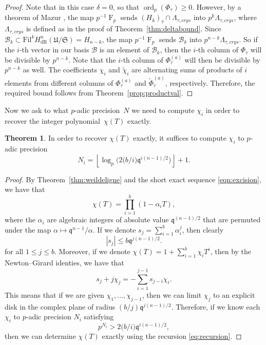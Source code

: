 \documentclass[a4paper,11pt]{article}
\numberwithin{equation}{section}
\providecommand{\floor}[1]{\left\lfloor#1\right\rfloor}   %
\DeclareMathOperator{\ord}{ord}          %
\DeclareMathOperator{\Frob}{F}           %
\providecommand{\HdR}{H_{\text{dR}}}    %
\providecommand{\cB}{\mathcal{B}} %
\theoremstyle{definition}
\newtheorem{thm}{Theorem}[section]
\begin{document}
\begin{proof} 
Note that in this case $\delta=0$, so that $\ord_p(\Phi_{\tau}) \geq 0$. However, by a theorem of 
Mazur \cite{Mazur1972}, the map $p^{-1} \Frob_p$ sends $(H_k)_{\hat{\tau}} \cap \Lambda_{\tau,crys}$ 
into $p^k \Lambda_{\tau,crys}$, where $\Lambda_{\tau,crys}$ is defined as in the proof of Theorem~\ref{thm:deltabound}. 
Since $\cB_k \subset \mbox{Fil}^{k} \HdR^{n}(\mathfrak{U}/\mathfrak{S}) = H_{n-k}$, the map $p^{-1} \Frob_p$ sends
$\cB_k$ into $p^{n-k} \Lambda_{\tau,crys}$. So if the $i$-th vector in our basis $\cB$ is an element of $\cB_k$, 
then the $i$-th column of $\Phi_{\tau}$ will be divisible by $p^{n-k}$. Note that the $i$-th column of $\Phi_{\tau}^{(a)}$
will then be divisible by $p^{n-k}$ as well. The coefficients $\chi_i$ and $\tilde{\chi}_i$ are alternating sums of
products of $i$ elements from different columns of $\Phi_{\tau}^{(a)}$ and $\tilde{\Phi}_{\tau}^{(a)}$, respectively.
Therefore, the required bound follows from Theorem~\ref{prop:productval}. 
\end{proof}

Now we ask to what $p$-adic precision~$N$ we need to compute $\chi_i$ 
in order to recover the integer polynomial~$\chi(T)$ exactly.

\begin{thm} \label{thm:N0}
In order to recover $\chi(T)$ exactly, it suffices to compute 
$\chi_i$ to $p$-adic precision 
\begin{equation*}
N_i = \floor{\log_p \bigl( 2 \bigl( b/i \bigr) \mathfrak{q}^{i (n-1) / 2} \bigr)}+1.
\end{equation*}
\end{thm}

\begin{proof}
By Theorem~\ref{thm:weildeligne} and the short exact sequence \eqref{eqn:excision}, we have that
\[
\chi(T)=\prod_{i=1}^b (1-\alpha_i T),
\]
where the $\alpha_i$ are algebraic integers of absolute value $\mathfrak{q}^{(n-1)/2}$ that are
permuted under the map $\alpha \mapsto \mathfrak{q}^{n-1}/\alpha$. If we denote
$s_j = \sum_{i=1}^{b} \alpha_i^j$, then clearly
\[
|s_j| \leq b \mathfrak{q}^{j (n-1)/2}.
\]
for all $1 \leq j \leq b$. Moreover, if we denote $\chi(T) = 1+\sum_{i=1}^{b} \chi_i T^i$, 
then by the Newton--Girard identies, we have that
\begin{equation} \label{eq:recursion}
s_j+j \chi_j = - \sum_{i=1}^{j-1} s_{j-i} \chi_i.
\end{equation}
This means that if we are given $\chi_1,\ldots,\chi_{j-1}$, then we can limit $\chi_j$ to an explicit 
 disk in the complex plane of radius $(b/j) \mathfrak{q}^{j (n-1) / 2}$. Therefore, 
if we know each $\chi_i$ to $p$-adic precision $N_i$ satisfying
\[
p^{N_i} > 2 \bigl( b/i \bigr) \mathfrak{q}^{i (n-1) / 2},
\] 
then we can determine $\chi(T)$ exactly using the recursion \eqref{eq:recursion}.
\end{proof}
\end{document}
